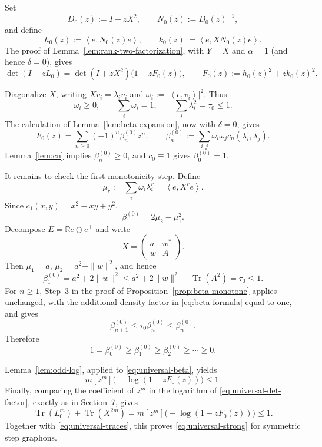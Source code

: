 \documentclass[11pt]{article}
\newcommand{\R}{\mathbb{R}}
\newcommand{\ip}[2]{\left\langle #1,#2\right\rangle}
\newcommand{\Tr}{\operatorname{Tr}}
\begin{document}
Set
\[
   D_0(z):=I+zX^2,
   \qquad N_0(z):=D_0(z)^{-1},
\]
and define
\[
   h_0(z):=\ip{e}{N_0(z)e},
   \qquad
   k_0(z):=\ip{e}{XN_0(z)e}.
\]
The proof of Lemma~\ref{lem:rank-two-factorization}, with $Y=X$ and $\alpha=1$ (and hence $\delta=0$),
gives
\begin{equation}
   \det(I-zL_0)
   =\det(I+zX^2)\bigl(1-zF_0(z)\bigr),
   \qquad
   F_0(z):=h_0(z)^2+zk_0(z)^2.
   \label{eq:universal-det-factor}
\end{equation}

Diagonalize $X$, writing $Xv_i=\lambda_i v_i$ and
$\omega_i:=|\ip{e}{v_i}|^2$.  Thus
\[
   \omega_i\ge0,
   \qquad
   \sum_i\omega_i=1,
   \qquad
   \sum_i\lambda_i^2=\tau_0\le1.
\]
The calculation of Lemma~\ref{lem:beta-expansion}, now with $\delta=0$, gives
\begin{equation}
   F_0(z)=\sum_{n\ge0}(-1)^n\beta_n^{(0)}z^n,
   \qquad
   \beta_n^{(0)}
   :=\sum_{i,j}\omega_i\omega_jc_n(\lambda_i,\lambda_j).
   \label{eq:universal-beta}
\end{equation}
Lemma~\ref{lem:cn} implies $\beta_n^{(0)}\ge0$, and $c_0\equiv1$ gives
$\beta_0^{(0)}=1$.

It remains to check the first monotonicity step.  Define
\[
   \mu_r:=\sum_i\omega_i\lambda_i^r=\ip{e}{X^re}.
\]
Since $c_1(x,y)=x^2-xy+y^2$,
\begin{equation}
   \beta_1^{(0)}=2\mu_2-\mu_1^2.
   \label{eq:universal-beta-one}
\end{equation}
Decompose $E=\R e\oplus e^\perp$ and write
\[
   X=
   \begin{pmatrix}
      a&w^*\\
      w&A
   \end{pmatrix}.
\]
Then $\mu_1=a$, $\mu_2=a^2+\|w\|^2$, and hence
\[
   \beta_1^{(0)}=a^2+2\|w\|^2
   \le a^2+2\|w\|^2+\Tr(A^2)
   =\tau_0
   \le1.
\]
For $n\ge1$, Step~3 in the proof of Proposition~\ref{prop:beta-monotone} applies unchanged, with
the additional density factor in \eqref{eq:beta-formula} equal to one, and gives
\[
   \beta_{n+1}^{(0)}\le\tau_0\beta_n^{(0)}\le\beta_n^{(0)}.
\]
Therefore
\[
   1=\beta_0^{(0)}\ge\beta_1^{(0)}\ge\beta_2^{(0)}\ge\cdots\ge0.
\]

Lemma~\ref{lem:odd-log}, applied to \eqref{eq:universal-beta}, yields
\[
   m[z^m]\bigl(-\log(1-zF_0(z))\bigr)\le1.
\]
Finally, comparing the coefficient of $z^m$ in the logarithm of
\eqref{eq:universal-det-factor}, exactly as in Section~7, gives
\[
   \Tr(L_0^m)+\Tr(X^{2m})
   =m[z^m]\bigl(-\log(1-zF_0(z))\bigr)
   \le1.
\]
Together with \eqref{eq:universal-traces}, this proves \eqref{eq:universal-strong} for symmetric
step graphons.
\end{document}

